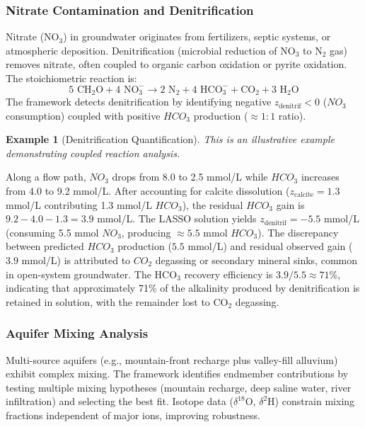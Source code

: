 \documentclass[12pt,a4paper]{article}
\theoremstyle{plain}
\theoremstyle{definition}
\newtheorem{example}[theorem]{Example}
\theoremstyle{remark}
\begin{document}
\subsubsection{Nitrate Contamination and Denitrification}

Nitrate (NO$_3$) in groundwater originates from fertilizers, septic systems, or atmospheric deposition. Denitrification (microbial reduction of NO$_3$ to N$_2$ gas) removes nitrate, often coupled to organic carbon oxidation or pyrite oxidation. The stoichiometric reaction is:
\begin{equation}
	\text{5 CH}_2\text{O} + \text{4 NO}_3^- \to \text{2 N}_2 + \text{4 HCO}_3^- + \text{CO}_2 + \text{3 H}_2\text{O}
\end{equation}
The framework detects denitrification by identifying negative $z_{\text{denitrif}} < 0$ ($NO_3$ consumption) coupled with positive $HCO_3$ production ($\approx 1:1$ ratio).

\begin{example}[Denitrification Quantification]
	\textit{This is an illustrative example demonstrating coupled reaction analysis.}

	Along a flow path, $NO_3$ drops from 8.0 to 2.5 mmol/L while $HCO_3$ increases from 4.0 to 9.2 mmol/L. After accounting for calcite dissolution ($z_{\text{calcite}} = 1.3$ mmol/L contributing 1.3 mmol/L $HCO_3$), the residual $HCO_3$ gain is $9.2 - 4.0 - 1.3 = 3.9$ mmol/L. The LASSO solution yields $z_{\text{denitrif}} = -5.5$ mmol/L (consuming 5.5 mmol $NO_3$, producing $\approx 5.5$ mmol $HCO_3$). The discrepancy between predicted $HCO_3$ production ($5.5$ mmol/L) and residual observed gain ($3.9$ mmol/L) is attributed to $CO_2$ degassing or secondary mineral sinks, common in open-system groundwater. The HCO$_3$ recovery efficiency is $3.9/5.5 \approx 71$\%, indicating that approximately 71\% of the alkalinity produced by denitrification is retained in solution, with the remainder lost to CO$_2$ degassing.
\end{example}

\subsubsection{Aquifer Mixing Analysis}

Multi-source aquifers (e.g., mountain-front recharge plus valley-fill alluvium) exhibit complex mixing. The framework identifies endmember contributions by testing multiple mixing hypotheses (mountain recharge, deep saline water, river infiltration) and selecting the best fit. Isotope data ($\delta^{18}$O, $\delta^2$H) constrain mixing fractions independent of major ions, improving robustness.
\end{document}
